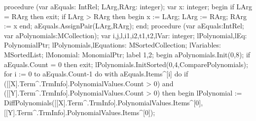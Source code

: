 \nwendcode{}\nwdocspar
\nwenddocs{}\endmoddef\nwstartdeflinemarkup{}\nwenddeflinemarkup
procedure (var aEquals: IntRel; LArg,RArg: integer);
var
   x: integer;
begin
   if LArg = RArg then exit;
   if LArg > RArg then
   begin
      x := LArg;
      LArg := RArg;
      RArg := x
   end;
   aEquals.AssignPair(LArg,RArg);
end;
\eatline
{}\nwendcode{}\nwdocspar
\nwenddocs{}\endmoddef\nwstartdeflinemarkup{}\nwenddeflinemarkup
procedure (var aEquals:IntRel;
                                 var aPolynomials:MCollection);
var
   i,j,l,i1,i2,t1,t2,lVar: integer;
   lPolynomial,lEq: PolynomialPtr;
   lPolynomials,lEquations: MSortedCollection;
   lVariables: MSortedList;
   lMonomial: MonomialPtr;
label 1,2;
begin
   aPolynomials.Init(0,8);
   if aEquals.Count = 0 then exit;
   lPolynomials.InitSorted(0,4,ComparePolynomials);
   for i := 0 to aEquals.Count-1 do
      with aEquals.Items^[i] do
         if ([[X].Term^.TrmInfo].PolynomialValues.Count > 0) and
               ([[Y].Term^.TrmInfo].PolynomialValues.Count > 0) then
         begin
            lPolynomial := DiffPolynomials([[X].Term^.TrmInfo].PolynomialValues.Items^[0],
                                           [[Y].Term^.TrmInfo].PolynomialValues.Items^[0]);
